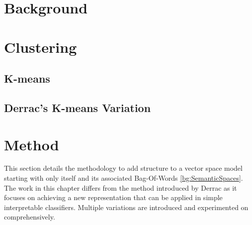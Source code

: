 
\section{Background}\label{ch3:background}

\section{Clustering}\label{bg:clustering}

\subsection{K-means}

\subsection{Derrac's K-means Variation}


\section{Method}\label{ch3:method}

This section details the methodology to add structure to a vector space model starting with only itself and its associated Bag-Of-Words \ref{bg:SemanticSpaces}.  The work in this chapter differs from the method introduced by Derrac \cite{Derrac2015} as it focuses on achieving a new representation that can be applied in simple interpretable classifiers. Multiple variations are introduced and experimented on comprehensively.%

